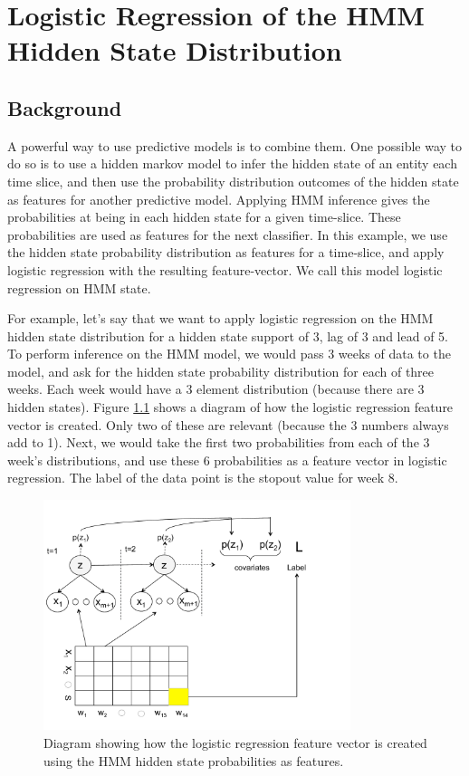 \chapter{Logistic Regression of the HMM Hidden State Distribution} \label{chap:logreg_hmm} 

\section{Background}
A powerful way to use predictive models is to combine them. One possible way to do so is to use a hidden markov model to infer the hidden state of an entity each time slice, and then use the probability distribution outcomes of the hidden state as features for another predictive model. Applying HMM inference gives the probabilities at being in each hidden state for a given time-slice. These probabilities are used as features for the next classifier. In this example, we use the hidden state probability distribution as features for a time-slice, and apply logistic regression with the resulting feature-vector. We call this model logistic regression on HMM state.

For example, let's say that we want to apply logistic regression on the HMM hidden state distribution for a hidden state support of 3, lag of 3 and lead of 5. To perform inference on the HMM model, we would pass 3 weeks of data to the model, and ask for the hidden state probability distribution for each of three weeks. Each week would have a 3 element distribution (because there are 3 hidden states). Figure \ref{fig:hmm_as_logreg} shows a diagram of how the logistic regression feature vector is created. Only two of these are relevant (because the 3 numbers always add to 1). Next, we would take the first two probabilities from each of the 3 week's distributions, and use these 6 probabilities as a feature vector in logistic regression. The label of the data point is the stopout value for week 8.

\begin{figure}[!ht]
  \caption{Diagram showing how the logistic regression feature vector is created using the HMM hidden state probabilities as features.}\label{fig:hmm_as_logreg}
  \centering
    \includegraphics[width=0.8\textwidth]{figures/hmm_as_logreg}
\end{figure}

